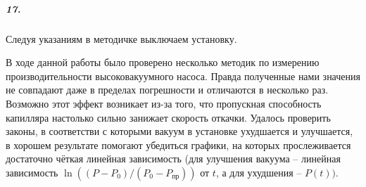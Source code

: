 \documentclass[a4paper,12pt]{article}
\begin{document}
\subparagraph*{17.} Следуя указаниям в методичке выключаем установку. 

\newpage








В ходе данной работы было проверено несколько методик по измерению производительности высоковакуумного насоса. Правда полученные нами значения не совпадают даже в пределах погрешности и отличаются в несколько раз. Возможно этот эффект возникает из-за того, что пропускная способность капилляра настолько сильно занижает скорость откачки.  Удалось проверить законы, в соответстви с которыми вакуум в установке ухудшается и улучшается, в хорошем результате помогают убедиться графики, на которых прослеживается достаточно чёткая линейная зависимость (для улучшения вакуума -- линейная зависимость $\ln ((P-P_0) / (P_0 - P_{пр}))$ от $t$, а для ухудшения -- $P(t))$.  
\end{document}
